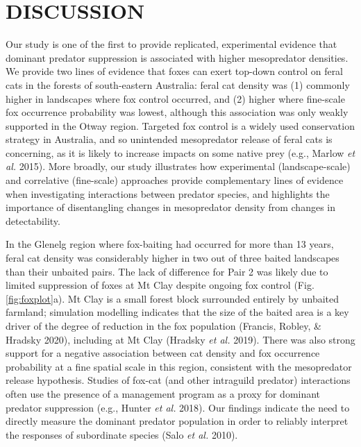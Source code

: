 \documentclass[preprint, 3p, authoryear]{elsarticle} %
\begin{document}
\newpage

\hypertarget{discussion}{%
\section{DISCUSSION}\label{discussion}}

Our study is one of the first to provide replicated, experimental evidence that dominant predator suppression is associated with higher mesopredator densities. We provide two lines of evidence that foxes can exert top-down control on feral cats in the forests of south-eastern Australia: feral cat density was (1) commonly higher in landscapes where fox control occurred, and (2) higher where fine-scale fox occurrence probability was lowest, although this association was only weakly supported in the Otway region. Targeted fox control is a widely used conservation strategy in Australia, and so unintended mesopredator release of feral cats is concerning, as it is likely to increase impacts on some native prey (e.g., Marlow \emph{et al.} 2015). More broadly, our study illustrates how experimental (landscape-scale) and correlative (fine-scale) approaches provide complementary lines of evidence when investigating interactions between predator species, and highlights the importance of disentangling changes in mesopredator density from changes in detectability.

In the Glenelg region where fox-baiting had occurred for more than 13 years, feral cat density was considerably higher in two out of three baited landscapes than their unbaited pairs. The lack of difference for Pair 2 was likely due to limited suppression of foxes at Mt Clay despite ongoing fox control (Fig. \ref{fig:foxplot}a). Mt Clay is a small forest block surrounded entirely by unbaited farmland; simulation modelling indicates that the size of the baited area is a key driver of the degree of reduction in the fox population (Francis, Robley, \& Hradsky 2020), including at Mt Clay (Hradsky \emph{et al.} 2019). There was also strong support for a negative association between cat density and fox occurrence probability at a fine spatial scale in this region, consistent with the mesopredator release hypothesis. Studies of fox-cat (and other intraguild predator) interactions often use the presence of a management program as a proxy for dominant predator suppression (e.g., Hunter \emph{et al.} 2018). Our findings indicate the need to directly measure the dominant predator population in order to reliably interpret the responses of subordinate species (Salo \emph{et al.} 2010).
\end{document}
